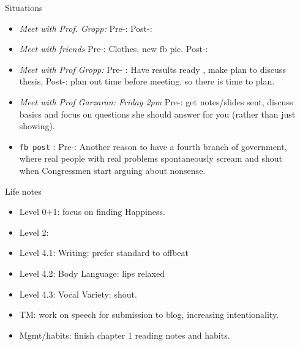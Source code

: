 \documentclass[serif, mathserif, final]{beamer}
\begin{document}
\begin{frame}{}
\begin{columns}
\begin{column}{0.25\linewidth}
  \begin{block}{ Situations} 
    \begin{itemize} 

\item \tiny \textit{Meet with Prof. Gropp:}  Pre-:  Post-: 

\item \tiny \textit{Meet with friends} Pre-: Clothes, new fb pic.  Post-: 

\item \tiny \textit{Meet with Prof Gropp: } Pre- : Have results ready
  , make plan to discuss thesis, Post-: plan out time before meeting,
  so there is time to plan. 

\item \tiny \textit{Meet with Prof Garzaran: Friday 2pm} Pre-: get notes/slides sent, discuss basics and focus on questions she should answer for you (rather than just showing). 
\item \tiny \texttt{fb post} : Pre-: Another reason to have a fourth branch of government, where real people with real problems spontaneously scream and shout when Congressmen start arguing
about nonsense.
    \end{itemize}
  \end{block} 

  
  \begin{block} {Life notes} 
    \begin{itemize} 
      \tiny \item \tiny Level 0+1: focus on finding Happiness. 
    \item \tiny Level 2: 
    \item \tiny Level 4.1: Writing: prefer standard to offbeat 
    \item \tiny Level 4.2: Body Language: lips relaxed
    \item \tiny Level 4.3: Vocal Variety: shout. 
    \item \tiny TM: work on speech for submission to blog, increasing intentionality. 
    \item \tiny Mgmt/habits: finish chapter 1 reading notes and habits. 
    \end{itemize} 
    
  \end{block} 
\end{column} %
\begin{column}{0.50\linewidth}
  

\end{column}
\end{columns}
\end{frame}
\end{document}
